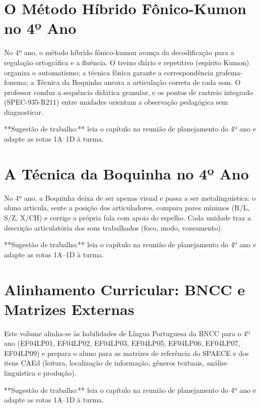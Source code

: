 
\chapter{O Método Híbrido Fônico-Kumon no 4º Ano}

No 4º ano, o método híbrido fônico-kumon avança da decodificação para a regulação ortográfica e a fluência. O treino diário e repetitivo (espírito Kumon) organiza o automatismo; a técnica fônica garante a correspondência grafema-fonema; a Técnica da Boquinha ancora a articulação correta de cada som. O professor conduz a sequência didática granular, e os pontos de rastreio integrado (SPEC-935-R211) entre unidades orientam a observação pedagógica sem diagnosticar.


\begin{dica}
**Sugestão de trabalho:** leia o capítulo na reunião de planejamento do 4º ano e adapte as rotas 1A–1D à turma.
\end{dica}

\chapter{A Técnica da Boquinha no 4º Ano}

No 4º ano, a Boquinha deixa de ser apenas visual e passa a ser metalinguística: o aluno articula, sente a posição dos articuladores, compara pares mínimos (R/L, S/Z, X/CH) e corrige a própria fala com apoio do espelho. Cada unidade traz a descrição articulatória dos sons trabalhados (foco, modo, vozeamento).


\begin{dica}
**Sugestão de trabalho:** leia o capítulo na reunião de planejamento do 4º ano e adapte as rotas 1A–1D à turma.
\end{dica}

\chapter{Alinhamento Curricular: BNCC e Matrizes Externas}

Este volume alinha-se às habilidades de Língua Portuguesa da BNCC para o 4º ano (EF04LP01, EF04LP02, EF04LP03, EF04LP05, EF04LP06, EF04LP07, EF04LP09) e prepara o aluno para as matrizes de referência do SPAECE e dos itens CAEd (leitura, localização de informação, gêneros textuais, análise linguística e produção).


\begin{dica}
**Sugestão de trabalho:** leia o capítulo na reunião de planejamento do 4º ano e adapte as rotas 1A–1D à turma.
\end{dica}

